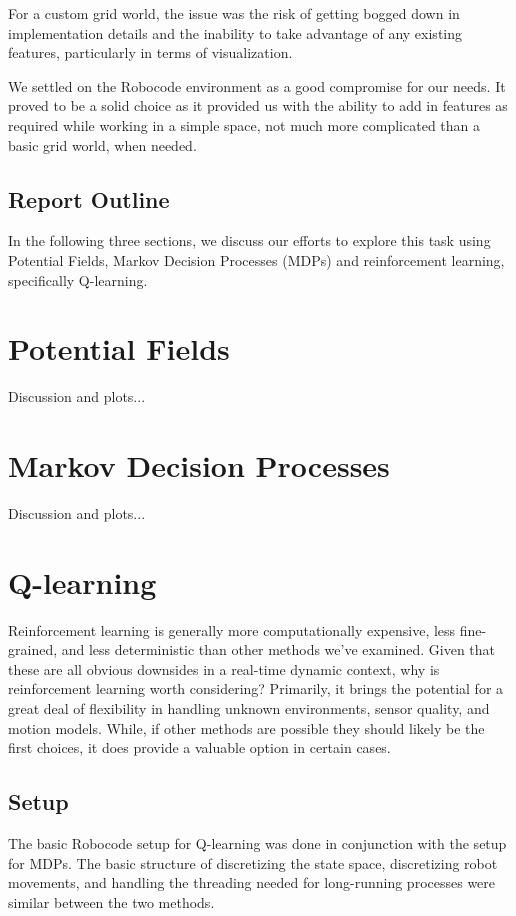 \documentclass{aiaa-tc}%
\begin{document}
For a custom grid world, the issue was the risk of getting bogged down
in implementation details and the inability to take advantage of any
existing features, particularly in terms of visualization.

We settled on the Robocode environment as a good compromise for our
needs. It proved to be a solid choice as it provided us with the
ability to add in features as required while working in a simple
space, not much more complicated than a basic grid world, when needed.


\subsection{Report Outline}
In the following three sections, we discuss our efforts to explore
this task using Potential Fields, Markov Decision Processes (MDPs) and
reinforcement learning, specifically Q-learning.

\section{Potential Fields}
\label{Potential Fields}
Discussion and plots...

\section{Markov Decision Processes}
\label{Markov Decision Processes}
Discussion and plots...

\section{Q-learning}
\label{Q-learning}

Reinforcement learning is generally more computationally expensive,
less fine-grained, and less deterministic than other methods we've
examined. Given that these are all obvious downsides in a
real-time dynamic context, why is reinforcement learning worth
considering? Primarily, it brings the potential for a great deal of
flexibility in handling unknown environments, sensor quality, and
motion models. While, if other methods are possible they should likely
be the first choices, it does provide a valuable option in certain
cases.

\subsection{Setup}

The basic Robocode setup for Q-learning was done in conjunction with
the setup for MDPs. The basic structure of discretizing the state
space, discretizing robot movements, and handling the threading needed
for long-running processes were similar between the two methods.
\end{document}
